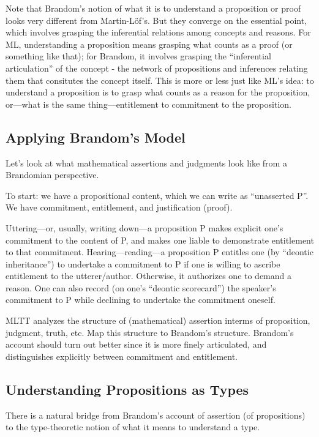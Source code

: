 Note that Brandom's notion of what it is to understand a proposition
or proof looks very different from Martin-L\"{o}f's.  But they
converge on the essential point, which involves grasping the
inferential relations among concepts and reasons.  For ML,
understanding a proposition means grasping what counts as a proof (or
something like that); for Brandom, it involves grasping the
``inferential articulation'' of the concept - the network of
propositions and inferences relating them that consitutes the concept
itself.  This is more or less just like ML's idea: to understand a
proposition is to grasp what counts as a reason for the proposition,
or---what is the same thing---entitlement to commitment to the
proposition.

\subsection{Applying Brandom's Model}
\label{subs:bapply}

Let's look at what mathematical assertions and judgments look like
from a Brandomian perspective.

To start: we have a propositional content, which we can write as
``unasserted P''.  We have commitment, entitlement, and justification
(proof).

Uttering---or, usually, writing down---a proposition P makes explicit
one's commitment to the content of P, and makes one liable to
demonstrate entitlement to that commitment.  Hearing---reading---a
proposition P entitles one (by ``deontic inheritance'') to undertake a
commitment to P if one is willing to ascribe entitlement to the
utterer/author.  Otherwise, it authorizes one to demand a reason.  One
can also record (on one's ``deontic scorecard'') the speaker's
commitment to P while declining to undertake the commitment oneself.

{\todo MLTT analyzes the structure of (mathematical) assertion interms
  of proposition, judgment, truth, etc.  Map this structure to
  Brandom's structure.  Brandom's account should turn out better since
  it is more finely articulated, and distinguishes explicitly between
  commitment and entitlement.}

\subsection{Understanding Propositions as Types}
\label{subs:brandomunderstanding}

There is a natural bridge from Brandom's account of assertion (of
propositions) to the type-theoretic notion of what it means to
understand a type.

